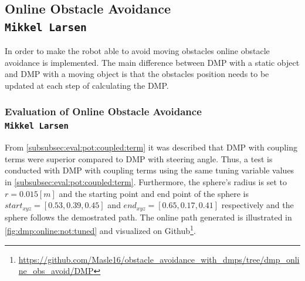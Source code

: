 \documentclass[../main.tex]{subfiles}
\begin{document}
\subsection{Online Obstacle Avoidance \\ \normalfont\normalsize\texttt{Mikkel Larsen}}
\label{subsec:avoidance:online}
In order to make the robot able to avoid moving obstacles online obstacle avoidance is implemented. The main difference between DMP with a static object and DMP with a moving object is that the obstacles position needs to be updated at each step of calculating the DMP. 

\subsubsection{Evaluation of Online Obstacle Avoidance \\ \normalfont\normalsize\texttt{Mikkel Larsen}}
\label{subsubsec:eval:avoidance:online}

From \autoref{subsubsec:eval:pot:coupled:term} it was described that DMP with coupling terms were superior compared to DMP with steering angle. Thus, a test is conducted with DMP with coupling terms using the same tuning variable values in \autoref{subsubsec:eval:pot:coupled:term}. Furthermore, the sphere's radius is set to $r=0.015[m]$ and the starting point and end point of the sphere is $start_{xyz}=[0.53, 0.39, 0.45]$ and $end_{xyz}=[0.65, 0.17, 0.41]$ respectively and the sphere follows the demostrated path. The online path generated is illustrated in \autoref{fig:dmp:online:not:tuned} and visualized on Github\footnote{\url{https://github.com/Masle16/obstacle_avoidance_with_dmps/tree/dmp_online_obs_avoid/DMP}}. 
\end{document}
